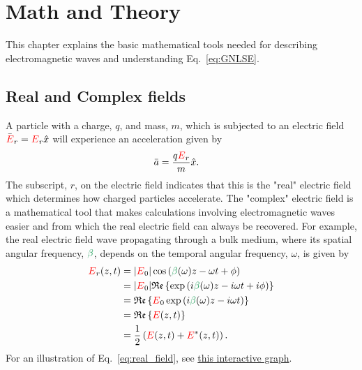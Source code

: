 \chapter{Math and Theory}
\label{ch:MathAndTheory}

This chapter explains the basic mathematical tools needed for describing electromagnetic waves and understanding Eq.~\ref{eq:GNLSE}.


\section{Real and Complex fields}
A particle with a charge, $q$, and mass, $m$, which is subjected to an electric field $\Bar{\textcolor{red}{E}}_r =\textcolor{red}{E}_r \hat{x}$ will experience an acceleration given by
\begin{align}
    \Bar{a} &=  \frac{q\textcolor{red}{E}_r}{m}\hat{x}.
\end{align}
The subscript, $r$, on the electric field indicates that this is the "real" electric field which determines how charged particles accelerate. The "complex" electric field is a mathematical tool that makes calculations involving electromagnetic waves easier and from which the real electric field can always be recovered. For example, the real electric field wave propagating through a bulk medium, where its spatial angular frequency, $\betag$, depends on the temporal angular frequency, $\omega$, is given by  
\begin{align}
\label{eq:real_field}
    \E_r(z,t) &= |\E_0|\cos\left(\betag(\omega)z-\omega t+\phi\right) \\\nonumber 
     &=|\E_0| \real\left\{  \exp\left( i\betag(\omega)z-i\omega t+i\phi \right) \right\} \\ \nonumber 
     &= \real\left\{ \E_0 \exp\left( i\betag(\omega)z-i\omega t\right) \right\}  \\ \nonumber
     &= \real\left\{ \E(z,t) \right\}  \\ \nonumber
     &=  \frac{1}{2}\left( \E(z,t) + \E^*(z,t) \right).   
\end{align}
For an illustration of Eq.~\ref{eq:real_field}, see \href{https://www.desmos.com/calculator/fgvozursrl}{this interactive graph}. 

